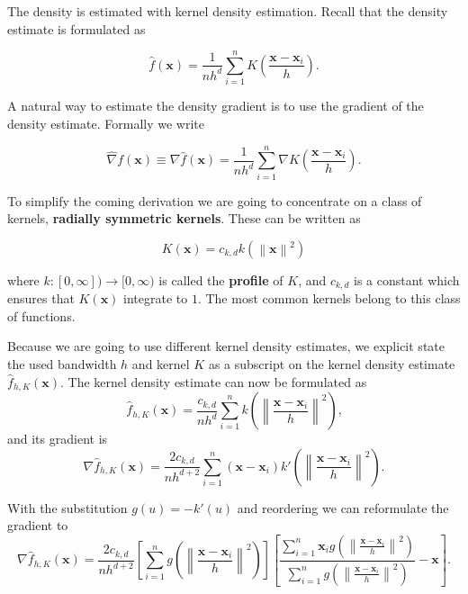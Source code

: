 \documentclass{article}
\newcommand{\norm}[1]{\left\lVert#1\right\rVert}
\begin{document}
The density is estimated with kernel density estimation. Recall that the density estimate is formulated as

\begin{equation}
	\hat{f}(\bm{x}) = \frac{1}{nh^d} \sum_{i=1}^n K\left(\frac{\bm{x} - \bm{x}_i}{h} \right)\text{.}
	\label{eq:kernel-density-estimate-2}
\end{equation}

A natural way to estimate the density gradient is to use the gradient of the density estimate. Formally we write

\begin{equation}
	\hat\nabla f(\bm{x}) \equiv \nabla \hat{f}(\bm{x}) = \frac{1}{nh^d} \sum_{i=1}^n \nabla K\left(\frac{\bm{x} - \bm{x}_i}{h} \right)\text{.}
	\label{eq:kernel-density-gradient-estimate}
\end{equation}


To simplify the coming derivation we are going to concentrate on a class of kernels, \textbf{radially symmetric kernels}. These can be written as

\begin{equation}
	K(\bm{x}) = c_{k,d} k(\norm{\bm{x}}^2)
\end{equation}

where $k : [0, \infty]) \rightarrow [0, \infty)$ is called the \textbf{profile} of $K$, and $c_{k,d}$ is a constant which ensures that $K(\bm{x})$ integrate to $1$. The most common kernels belong to this class of functions.

Because we are going to use different kernel density estimates, we explicit state the used bandwidth $h$ and kernel $K$ as a subscript on the kernel density estimate $\hat{f}_{h,K}(\bm{x})$. The kernel density estimate can now be formulated as
\begin{equation}
	\hat{f}_{h,K}(\bm{x}) = \frac{c_{k,d}}{nh^d} \sum_{i=1}^n k\left(\norm{\frac{\bm{x} - \bm{x}_i}{h}}^2 \right)\text{,}
	\label{eq:kernel-density-estimate-radial-symetric}
\end{equation}
and its gradient is
\begin{equation}
	\nabla \hat{f}_{h,K}(\bm{x}) = \frac{2c_{k,d}}{nh^{d+2}} \sum_{i=1}^n (\bm{x} - \bm{x}_i)k'\left(\norm{\frac{\bm{x} - \bm{x}_i}{h}}^2 \right)\text{.}
	\label{eq:kernel-density-gradient-estimate-radial-symetric}
\end{equation}

With the substitution $g(u) = -k'(u)$ and reordering we can reformulate the gradient to
\begin{equation}
	\nabla \hat{f}_{h,K}(\bm{x}) = \frac{2c_{k,d}}{nh^{d+2}} \left[\sum_{i=1}^n g\left(\norm{\frac{\bm{x} - \bm{x}_i}{h}}^2 \right)\right] \left[\frac{\sum_{i=1}^n \bm{x}_i g\left(\norm{\frac{\bm{x} - \bm{x}_i}{h}}^2 \right)}{\sum_{i=1}^n g\left(\norm{\frac{\bm{x} - \bm{x}_i}{h}}^2 \right)} - \bm{x}\right]\text{.}
\end{equation}
\end{document}
